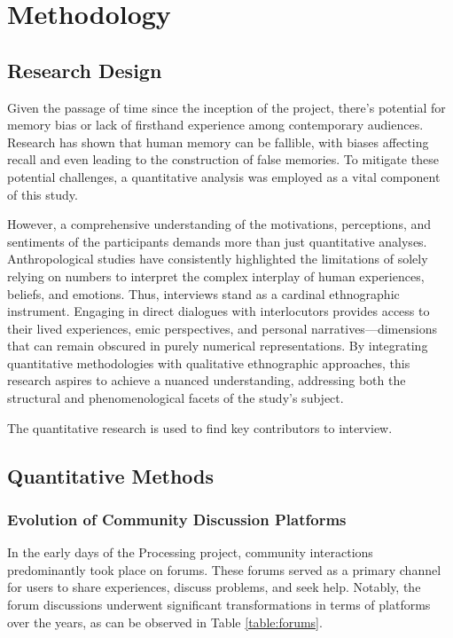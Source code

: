 \documentclass{article}
\begin{document}
\section{Methodology}

\subsection{Research Design}
Given the passage of time since the inception of the project, there's potential for memory bias or lack of firsthand experience among contemporary audiences. Research has shown that human memory can be fallible, with biases affecting recall and even leading to the construction of false memories. To mitigate these potential challenges, a quantitative analysis was employed as a vital component of this study.

However, a comprehensive understanding of the motivations, perceptions, and sentiments of the participants demands more than just quantitative analyses. Anthropological studies have consistently highlighted the limitations of solely relying on numbers to interpret the complex interplay of human experiences, beliefs, and emotions. Thus, interviews stand as a cardinal ethnographic instrument. Engaging in direct dialogues with interlocutors provides access to their lived experiences, emic perspectives, and personal narratives—dimensions that can remain obscured in purely numerical representations. By integrating quantitative methodologies with qualitative ethnographic approaches, this research aspires to achieve a nuanced understanding, addressing both the structural and phenomenological facets of the study's subject.

The quantitative research is used to find key contributors to interview.
\subsection{Quantitative Methods}
\subsubsection*{Evolution of Community Discussion Platforms}
In the early days of the Processing project, community interactions predominantly took place on forums. These forums served as a primary channel for users to share experiences, discuss problems, and seek help. Notably, the forum discussions underwent significant transformations in terms of platforms over the years, as can be observed in Table \ref{table:forums}.
\end{document}
